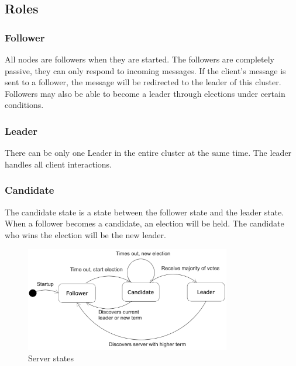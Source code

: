 \documentclass[12pt, a4paper]{article}
\begin{document}
\subsection{Roles}
  \subsubsection{Follower}
  All nodes are followers when they are started. The followers are completely passive, they can only respond to incoming
  messages. If the client's message is sent to a follower, the message will be redirected to the leader of this cluster. Followers may
  also be able to become a leader through elections under certain conditions.
  \subsubsection{Leader}
  There can be only one Leader in the entire cluster at the same time. The leader handles all client interactions.
  \subsubsection{Candidate}
  The candidate state is a state between the follower state and the leader state. When a follower becomes a candidate, an election
  will be held. The candidate who wins the election will be the new leader.
  \begin{figure}[htp]
      \centering
      \includegraphics[width=0.8\textwidth]{img/raft-state-diagram.png}
      \caption{Server states}
      \label{fig:aofc}
  \end{figure}
\end{document}
